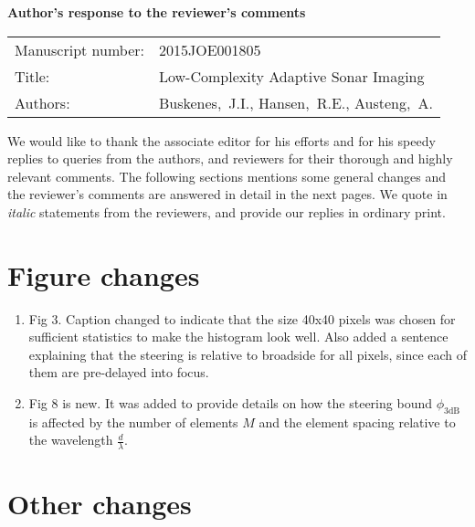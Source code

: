 \documentclass[11pt]{article} %
\newcommand\1{\vec 1}
\begin{document}

\begin{center}\Large\bf
Author's response to the reviewer's comments
\end{center}

\begin{center}
\begin{tabular}{l p{.6\linewidth}}\centering
Manuscript number: & 2015JOE001805 \\
Title: & Low-Complexity Adaptive Sonar Imaging \\
Authors: & Buskenes,~J.I., Hansen,~R.E., Austeng,~A.
\end{tabular}
\end{center}

We would like to thank the associate editor for his efforts and for his speedy replies to queries from the authors, and reviewers for their thorough and highly relevant comments. The following sections mentions some general changes and the reviewer's comments are answered in detail in the next pages. We quote in \textit{italic} statements from the reviewers, and provide our replies in ordinary print.


\section{Figure changes}

\begin{enumerate}
\item Fig 3. Caption changed to indicate that the size 40x40 pixels was chosen for sufficient statistics to make the histogram look well. Also added a sentence explaining that the steering is relative to broadside for all pixels, since each of them are pre-delayed into focus.
\item Fig 8 is new. It was added to provide details on how the steering bound $\phi_\mathrm{3dB}$ is affected by the number of elements $M$ and the element spacing relative to the wavelength $\frac{d}{\lambda}$.
\end{enumerate}


\section{Other changes}
\end{document}
